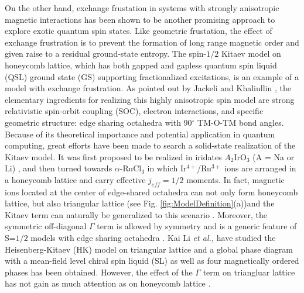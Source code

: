 \documentclass[aps,prb,reprint,amsfonts,amsmath,amssymb,showpacs,groupedaddress,superscriptaddress]{revtex4-1}
\begin{document}
On the other hand, exchange frustation in systems with strongly anisotropic magnetic interactions has been shown to be another promising approach to explore exotic quantum spin states. Like geometric frustation, the effect of exchange frustration is to prevent the formation of long range magnetic order and given raise to a residual ground-state entropy. The spin-$1/2$ Kitaev model \cite{Kitaev2006} on honeycomb lattice, which has both gapped and gapless quantum spin liquid (QSL) ground state (GS) supporting fractionalized excitations, is an example of a model with exchange frustration. As pointed out by Jackeli and Khaliullin \cite{Khaliullin2005, PhysRevLett.102.017205}, the elementary ingredients for realizing this highly anisotropic spin model are strong relativistic spin-orbit coupling (SOC), electron interactions, and specific geometric structure: edge sharing octahedra with 90$^\circ$ TM-O-TM bond angles. Because of its theoretical importance and potential application in quantum computing, great efforts have been made to search a solid-state realization of the Kitaev model. It was first proposed to be realized in iridates $A_2$IrO$_3$ (A = Na or Li) \cite{PhysRevLett.105.027204,PhysRevLett.108.127204,Chun2015,PhysRevLett.110.076402,PhysRevB.87.220407,PhysRevLett.110.097204,PhysRevLett.108.127203,PhysRevB.92.024413,PhysRevLett.112.077204,Rau2014}, and then turned towards $\alpha$-RuCl$_3$ \cite{PhysRevB.91.180401,Banerjee2016,PhysRevB.92.235119,PhysRevB.94.161106,PhysRevB.93.214431,PhysRevLett.118.107203,PhysRevLett.118.107203,PhysRevB.96.115103} in which Ir$^{4+}$/Ru$^{3+}$ ions are arranged in a honeycomb lattice and carry effective $j_{eff}=1/2$ moments. In fact, magnetic ions located at the center of edge-shared octahedra can not only form honeycomb lattice, but also triangular lattice (see Fig. \ref{fig:ModelDefinition}(a))and the Kitaev term can naturally be generalized to this scenario \cite{PhysRevB.93.104417,PhysRevB.89.014414}. Moreover, the symmetric off-diagonal $\Gamma$ term is allowed by symmetry and is a generic feature of S=$1/2$ models with edge sharing octahedra \cite {PhysRevLett.112.077204}. Kai Li \emph{et al.,} \cite{KaiLi2015} have studied the Heisenberg-Kitaev (HK) model on triangular lattice and a global phase diagram with a mean-field level chiral spin liquid (SL) as well as four magnetically ordered phases has been obtained. However, the effect of the $\Gamma$ term on triangluar lattice has not gain as much attention as on honeycomb lattice \cite{PhysRevLett.112.077204,Rau2014,PhysRevLett.118.107203,PhysRevB.96.115103,PhysRevB.93.214431,PhysRevB.100.144422}.
\end{document}
